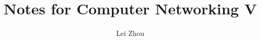 \documentclass{article}
\begin{document}
\title{Notes for Computer Networking V}
\author{Lei Zhou}
\maketitle

%

%

%

%


\end{document}
